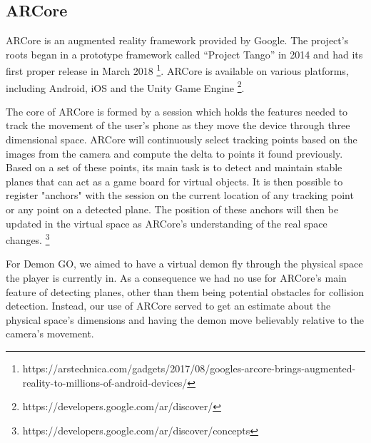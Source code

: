 \subsection{ARCore}
ARCore is an augmented reality framework provided by Google.
The project's roots began in a prototype framework called \enquote{Project Tango} in 2014 and had its first proper release in March 2018 \footnote{https://arstechnica.com/gadgets/2017/08/googles-arcore-brings-augmented-reality-to-millions-of-android-devices/}.
ARCore is available on various platforms, including Android, iOS and the Unity Game Engine \footnote{https://developers.google.com/ar/discover/}.

The core of ARCore is formed by a session which holds the features needed to track the movement of the user's phone as they move the device through three dimensional space.
ARCore will continuously select tracking points based on the images from  the camera and compute the delta to points it found previously.
Based on a set of these points, its main task is to detect and maintain stable planes that can act as a game board for virtual objects.
It is then possible to register "anchors" with the session on the current location of any tracking point or any point on a detected plane.
The position of these anchors will then be updated in the virtual space as ARCore's understanding of the real space changes. \footnote{https://developers.google.com/ar/discover/concepts}

For Demon GO, we aimed to have a virtual demon fly through the physical space the player is currently in.
As a consequence we had no use for ARCore's main feature of detecting planes, other than them being potential obstacles for collision detection.
Instead, our use of ARCore served to get an estimate about the physical space's dimensions and having the demon move believably relative to the camera's movement.


